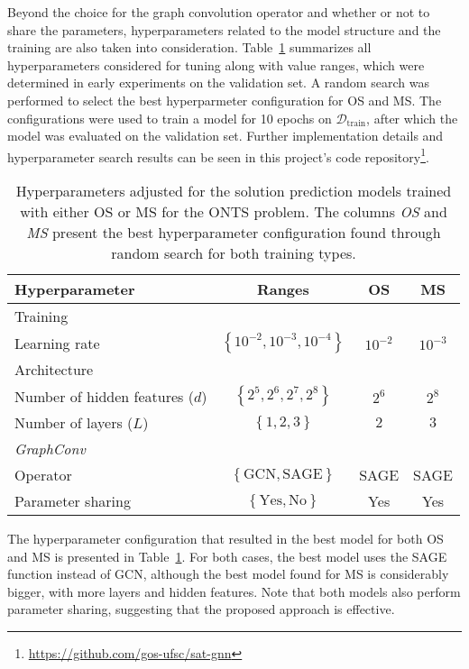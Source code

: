 Beyond the choice for the graph convolution operator and whether or not to share the parameters, hyperparameters related to the model structure and the training are also taken into consideration.
Table~\ref{tab:hyperparameters} summarizes all hyperparameters considered for tuning along with value ranges, which were determined in early experiments on the validation set.
A random search was performed to select the best hyperparmeter configuration for OS and MS.
The configurations were used to train a model for 10 epochs on $\mathcal{D}_\textrm{train}$, after which the model was evaluated on the validation set.
Further implementation details and hyperparameter search results can be seen in this project's code repository\footnote{\url{https://github.com/gos-ufsc/sat-gnn}}.

\begin{table}[h]
    \centering
    \caption{Hyperparameters adjusted for the solution prediction models trained with either OS or MS for the ONTS problem. The columns  \emph{OS} and \emph{MS} present the best hyperparameter configuration found through random search for both training types.}
    \label{tab:hyperparameters}
    \begin{tabular}{l|c|c|c}
	\toprule
	Hyperparameter & Ranges & OS & MS \\
	\midrule
	Training & & & \\
	\quad Learning rate & $\left\{ 10^{-2}, 10^{-3}, 10^{-4} \right\} $   & $10^{-2}$ & $10^{-3}$ \\
	Architecture &  & & \\
	\quad Number of hidden features ($d$) & $\left\{ 2^{5},2^{6},2^{7},2^{8} \right\} $   & $2^{6}$ & $2^{8}$ \\
	\quad Number of layers ($L$)  & $\left\{ 1, 2, 3 \right\} $   & $2$ & $3$ \\
	\emph{GraphConv} &  & & \\
	\quad Operator & $\left\{ \text{GCN}, \text{SAGE} \right\} $   & SAGE & SAGE \\
	\quad Parameter sharing & $\left\{ \text{Yes}, \text{No} \right\} $   & Yes & Yes \\
	\bottomrule
    \end{tabular}
\end{table}

The hyperparameter configuration that resulted in the best model for both OS and MS is presented in Table~\ref{tab:hyperparameters}.
For both cases, the best model uses the SAGE function instead of GCN, although the best model found for MS is considerably bigger, with more layers and hidden features.
Note that both models also perform parameter sharing, suggesting that the proposed approach is effective.

